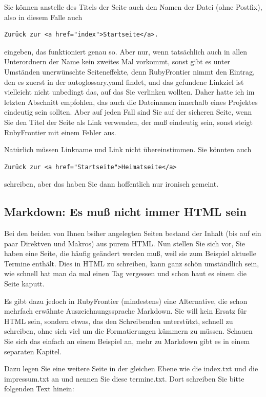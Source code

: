 \documentclass[11pt]{report}
\begin{document}
Sie können anstelle des Titels der Seite auch den Namen der Datei
(ohne Postfix), also in diesem Falle auch


\begin{verbatim}
Zurück zur <a href="index">Startseite</a>.
\end{verbatim}

eingeben, das funktioniert genau so. Aber nur, wenn tatsächlich auch
in allen Unterordnern der Name kein zweites Mal vorkommt, sonst gibt
es unter Umständen unerwünschte Seiteneffekte, denn RubyFrontier nimmt
den Eintrag, den es zuerst in der autoglossary.yaml findet, und das
gefundene Linkziel ist vielleicht nicht unbedingt das, auf das Sie
verlinken wollten. Daher hatte ich im letzten Abschnitt empfohlen, das
auch die Dateinamen innerhalb eines Projektes eindeutig sein
sollten. Aber auf jeden Fall sind Sie auf der sicheren Seite, wenn Sie
den Titel der Seite als Link verwenden, der muß eindeutig sein, sonst
steigt RubyFrontier mit einem Fehler aus.


Natürlich müssen Linkname und Link nicht übereinstimmen. Sie könnten
auch


\begin{verbatim}
Zurück zur <a href="Startseite">Heimatseite</a>
\end{verbatim}

schreiben, aber das haben Sie dann hoffentlich nur ironisch gemeint.
\subsection{Markdown: Es muß nicht immer HTML sein}
\label{sec-2-1-2-2}


Bei den beiden von Ihnen bsiher angelegten Seiten bestand der Inhalt
(bis auf ein paar Direktven und Makros) aus purem HTML. Nun stellen
Sie sich vor, Sie haben eine Seite, die häufig geändert werden muß,
weil sie zum Beispiel aktuelle Termine enthält. Dies in HTML zu
schreiben, kann ganz schön umständlich sein, wie schnell hat man da
mal einen Tag vergessen und schon haut es einem die Seite kaputt.


Es gibt dazu jedoch in RubyFrontier (mindestens) eine Alternative, die
schon mehrfach erwähnte Auszeichnungssprache Markdown. Sie will kein
Ersatz für HTML sein, sondern etwas, das den Schreibenden unterstützt,
schnell zu schreiben, ohne sich viel um die Formatierungen kümmern zu
müssen. Schauen Sie sich das einfach an einem Beispiel an, mehr zu
Markdown gibt es in einem separaten Kapitel.


Dazu legen Sie eine weitere Seite in der gleichen Ebene wie die
index.txt und die impressum.txt an und nennen Sie diese
termine.txt. Dort schreiben Sie bitte folgenden Text hinein:
\end{document}
